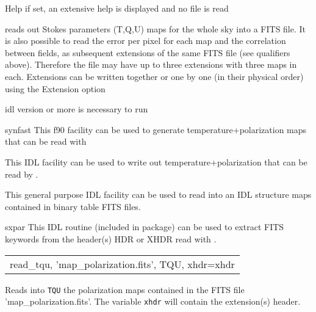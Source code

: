 \begin{keywords}
  \begin{kwlist}{} %
	\item[{Help}] if set, an extensive help is displayed and no
	file is read
   \end{kwlist}
\end{keywords}

\begin{codedescription}
{\thedocid { }reads out Stokes parameters (T,Q,U) maps for the whole
sky into a FITS file. It is also possible to read the error per pixel for each
map and the correlation between fields, as subsequent extensions of the same FITS
file (see qualifiers above). Therefore the file may have up to three extensions with three
maps in each. Extensions can be written together or one by one (in
their physical order) using the Extension option}
\end{codedescription}



\begin{related}
  \begin{sulist}{} %
  \item[idl] version \idlversion or more is necessary to run \thedocid
  \item[synfast] This \healpix f90 facility can be used to generate
  temperature+polarization maps that can be read with \thedocid
  \item[\htmlref{write\_tqu}{idl:write_tqu}] This \healpix IDL facility can be used to write
  out temperature+polarization that can be read by \thedocid.

  \item[\htmlref{read\_fits\_s}{idl:read_fits_s}] This general purpose \healpix IDL facility can be used to read
  into an IDL structure maps contained in binary table FITS files.
  \item[sxpar] This IDL routine (included in \healpix package) can be
  used to extract FITS keywords from the header(s) HDR or XHDR read with \thedocid.
  \end{sulist}
\end{related}


\begin{example}
{
\begin{tabular}{l} %
read\_tqu, 'map\_polarization.fits', TQU, xhdr=xhdr\\
\end{tabular}
}
{
Reads into {\tt TQU} the polarization maps contained in the FITS file
'map\_polarization.fits'.
The variable {\tt xhdr} will contain the extension(s) header.
}
\end{example}

